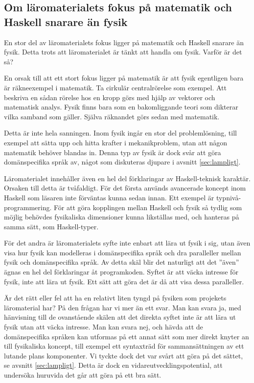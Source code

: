 \begin{binge}
\subsection{Om läromaterialets fokus på matematik och Haskell snarare än fysik}

En stor del av läromaterialets fokus ligger på matematik och Haskell snarare än
fysik. Detta trots att läromaterialet är tänkt att handla om fysik. Varför är
det så?

En orsak till att ett stort fokus ligger på matematik är att fysik egentligen
bara är räkneexempel i matematik. Ta cirkulär centralrörelse som exempel. Att
beskriva en sådan rörelse hos en kropp görs med hjälp av vektorer och
matematisk analys. Fysik finns bara som en bakomliggande teori som dikterar
vilka samband som gäller. Själva räknandet görs sedan med matematik.

Detta är inte hela sanningen. Inom fysik ingår en stor del problemlösning, till
exempel att sätta upp och hitta krafter i mekanikproblem, utan att någon
matematik behöver blandas in. Denna typ av fysik är dock svår att göra
domänspecifika språk av, något som diskuteras djupare i avsnitt
\ref{sec:lampligt}.

Läromaterialet innehåller även en hel del förklaringar av Haskell-teknisk
karaktär. Orsaken till detta är tvåfaldigt. För det första
används avancerade koncept inom Haskell som läsaren inte förväntas kunna sedan
innan. Ett exempel är typnivå-programmering. För att göra kopplingen mellan
Haskell och fysik så tydlig som möjlig behövdes fysikaliska dimensioner kunna
likställas med, och hanteras på samma sätt, som Haskell-typer.

För det andra är läromaterialets syfte inte enbart att lära ut fysik i sig,
utan även visa hur fysik kan modelleras i domänspecifika språk och dra
paralleller mellan fysik och domänspecifika språk. Av detta skäl blir det
naturligt att det ''även'' ägnas en hel del förklaringar åt programkoden.
Syftet är att väcka intresse för fysik, inte att lära ut fysik. Ett sätt att
göra det är då att visa dessa paralleller.

Är det rätt eller fel att ha en relativt liten tyngd på fysiken som projekets
läromaterial har? På den frågan har vi mer än ett svar. Man kan svara ja, med
hänvisning till de ovanstående skälen att det direkta syftet inte är att lära
ut fysik utan att väcka intresse. Man kan svara nej, och hävda att de
domänspecifika språken kan utformas på ett annat sätt som mer direkt
knyter an till fysikaliska koncept, till exempel ett syntaxträd för
sammansättningen av ett lutande plans komponenter. Vi tyckte dock det var svårt
att göra på det sättet, se avsnitt \ref{sec:lampligt}. Detta är dock en
vidareutvecklingspotential, att undersöka huruvida det går att göra på ett bra
sätt.


\end{binge}
